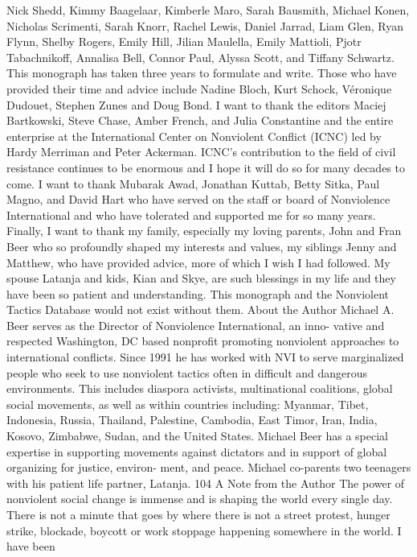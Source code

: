 \documentclass[twoside,a4paper,12pt,fleqn,openany]{extbook}
\begin{document}
Nick Shedd, Kimmy Baagelaar, Kimberle Maro, Sarah Bausmith, Michael Konen, Nicholas Scrimenti, Sarah Knorr,
Rachel Lewis, Daniel Jarrad, Liam Glen, Ryan Flynn, Shelby Rogers, Emily Hill, Jilian Maulella, Emily Mattioli, Pjotr
Tabachnikoff, Annalisa Bell, Connor Paul, Alyssa Scott, and Tiffany Schwartz.
This monograph has taken three years to formulate and write. Those who have provided their time and advice
include Nadine Bloch, Kurt Schock, Véronique Dudouet, Stephen Zunes and Doug Bond.
I want to thank the editors Maciej Bartkowski, Steve Chase, Amber French, and Julia Constantine and the entire
enterprise at the International Center on Nonviolent Conflict (ICNC) led by Hardy Merriman and Peter Ackerman.
ICNC’s contribution to the field of civil resistance continues to be enormous and I hope it will do so for many
decades to come.
I want to thank Mubarak Awad, Jonathan Kuttab, Betty Sitka, Paul Magno, and David Hart who have served on
the staff or board of Nonviolence International and who have tolerated and supported me for so many years.
Finally, I want to thank my family, especially my loving parents, John and Fran Beer who so profoundly shaped
my interests and values, my siblings Jenny and Matthew, who have provided advice, more of which I wish I had
followed. My spouse Latanja and kids, Kian and Skye, are such blessings in my life and they have been so
patient and understanding. This monograph and the Nonviolent Tactics Database would not exist without them.
About the Author
Michael A. Beer serves as the Director of Nonviolence International, an inno-
vative and respected Washington, DC based nonprofit promoting nonviolent
approaches to international conflicts. Since 1991 he has worked with NVI to
serve marginalized people who seek to use nonviolent tactics often in difficult
and dangerous environments. This includes diaspora activists, multinational
coalitions, global social movements, as well as within countries including:
Myanmar, Tibet, Indonesia, Russia, Thailand, Palestine, Cambodia, East Timor,
Iran, India, Kosovo, Zimbabwe, Sudan, and the United States. Michael Beer has a special expertise
in supporting movements against dictators and in support of global organizing for justice, environ-
ment, and peace. Michael co-parents two teenagers with his patient life partner, Latanja.
104
A Note from the Author
The power of nonviolent social change is immense and is shaping the world every single
day. There is not a minute that goes by where there is not a street protest, hunger strike,
blockade, boycott or work stoppage happening somewhere in the world. I have been
\end{document}
